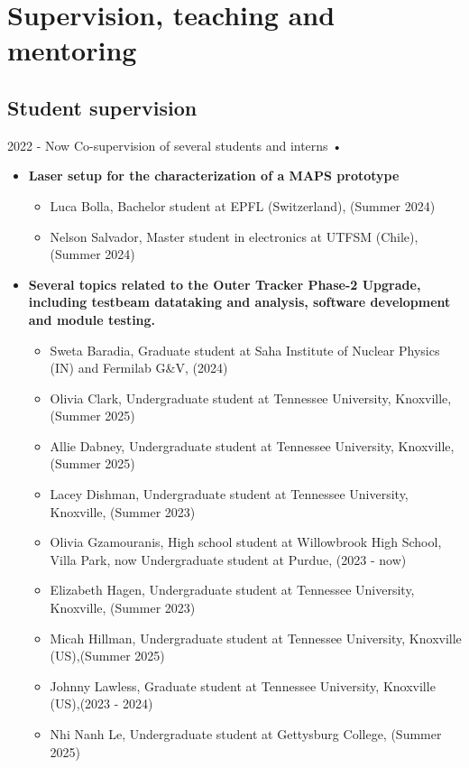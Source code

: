 \section{Supervision, teaching and mentoring}

\subsection{Student supervision}
   \teaching
    {2022 - Now}
    {Co-supervision of several students and interns • }{
    \begin{itemize}
    \item {\bf Laser setup for the characterization of a MAPS prototype}
	\begin{itemize}
	\item Luca Bolla, Bachelor student at EPFL (Switzerland), (Summer 2024)
	\item Nelson Salvador, Master student in electronics at UTFSM (Chile), (Summer 2024)
	\end{itemize}
    \item {\bf Several topics related to the  Outer Tracker Phase-2 Upgrade, including testbeam datataking and analysis, software development and module testing.}
    \begin{itemize}
    \item Sweta Baradia, Graduate student at Saha Institute of Nuclear Physics (IN) and Fermilab G\&V, (2024)
    \item Olivia Clark, Undergraduate student at Tennessee University, Knoxville, (Summer 2025) 
    \item Allie Dabney, Undergraduate student at Tennessee University, Knoxville, (Summer 2025) 
    \item Lacey Dishman, Undergraduate student at Tennessee University, Knoxville, (Summer 2023) 
    \item Olivia Gzamouranis, High school student at Willowbrook High School, Villa Park, now Undergraduate student at Purdue, (2023 - now)
    \item Elizabeth Hagen, Undergraduate student at Tennessee University, Knoxville, (Summer 2023)
    \item Micah Hillman, Undergraduate student at Tennessee University, Knoxville (US),(Summer 2025)
    \item Johnny Lawless, Graduate student at Tennessee University, Knoxville (US),(2023 - 2024)
	\item Nhi Nanh Le, Undergraduate student at Gettysburg College, (Summer 2025)    

\end{itemize}
\end{itemize}}

